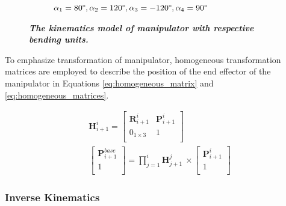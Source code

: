 \begin{figure}[H]
\begin{subfigure}{0.85\textwidth}
        \caption{$\alpha_1=80\degree,\alpha_2=120 \degree,\alpha_3=-120\degree,\alpha_4=90\degree$}
    \end{subfigure}
    \caption[The kinematics model of manipulator with respective bending units]
    {\centering \textit{\textbf{The kinematics model of manipulator with respective bending units.}}}
    \label{fig:different}
\end{figure}

\noindent To emphasize transformation of manipulator, homogeneous transformation matrices \cite{homogeneous} are 
employed to describe the position of the end effector of the manipulator in Equations \ref{eq:homogeneous_matrix} 
and \ref{eq:homogeneous_matrices}.

\begin{align}
    &\textbf{H}_{i+1}^{i} = 
    \begin{bmatrix}
        \textbf{R}_{i+1}^{i} &  \textbf{P}_{i+1}^{i}\\
        0_{1\times3} & 1 \\
    \end{bmatrix} 
    \label{eq:homogeneous_matrix} \\
    &\begin{bmatrix}
        \textbf{P}_{i+1}^{base} \\
        1 \\
    \end{bmatrix}
    = \prod_{j=1}^{i}\textbf{H}_{j+1}^{j} \ 
    \times
    \begin{bmatrix}
        \textbf{P}_{i+1}^{i} \\
        1 \\
    \end{bmatrix} 
    \label{eq:homogeneous_matrices}
\end{align}

\subsubsection{Inverse Kinematics}


\newpage